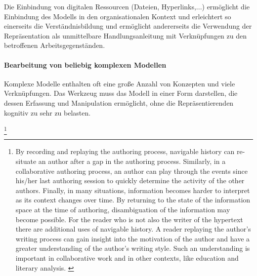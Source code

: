 Die Einbindung von digitalen Ressourcen (Dateien, Hyperlinks,...) ermöglicht die Einbindung des Modells in den organisationalen Kontext und erleichtert so einerseits die Verständnisbildung und ermöglicht andererseits die Verwendung der Repräsentation als unmittelbare Handlungsanleitung mit Verknüpfungen zu den betroffenen Arbeitsgegenständen.


\paragraph{Bearbeitung von beliebig komplexen Modellen} %
\label{par:bearbeitung_von_beliebig_komplexen_modellen}

Komplexe Modelle enthalten oft eine große Anzahl von Konzepten und viele Verknüpfungen. Das Werkzeug muss das Modell in einer Form darstellen, die dessen Erfassung und Manipulation ermöglicht, ohne die Repräsentierenden kognitiv zu sehr zu belasten.






\footnote{By recording and replaying the authoring process, navigable history can re-situate an author after a gap in the authoring process. Similarly, in a collaborative authoring process, an author can play through the events since his/her last authoring session to quickly determine the activity of the other authors. Finally, in many situations, information becomes harder to interpret as its context changes over time. By returning to the state of the information space at the time of authoring, disambiguation of the information may become possible. For the reader who is not also the writer of the hypertext there are additional uses of navigable history. A reader replaying the author’s writing process can gain insight into the motivation of the author and have a greater understanding of the author’s writing style. Such an understanding is important in collaborative work and in other contexts, like education and literary analysis. \citep{Shipman00}}

